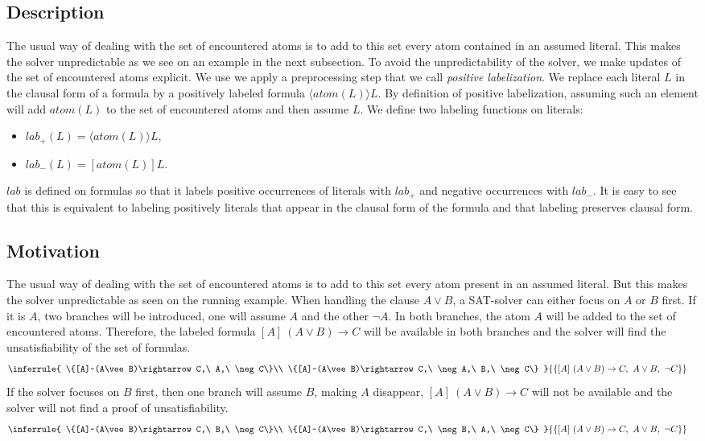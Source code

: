 \documentclass[a4paper,11pt]{article}
\newcommand{\atom}{\mathit{atom}}
\newcommand{\T}{\mathit{lab}}
\begin{document}
\subsection{Description}
The usual way of dealing with the set of encountered atoms is to add to this set every atom
contained in an assumed literal. This makes the solver unpredictable as we see on an example in
the next subsection.
To avoid the unpredictability of the solver, we make updates of the set of encountered atoms explicit.
We use we apply a preprocessing step that we call \emph{positive labelization}.
We replace each literal $L$ in the clausal form of a formula
by a positively labeled formula $\langle\atom(L)\rangle L$. By definition of positive labelization,
assuming such an element will add $\atom(L)$ to the set of encountered atoms and then assume $L$.
We define two labeling functions on literals:
\begin{itemize}
 \item $\T_+(L)=\langle\atom(L)\rangle L$,
 \item $\T_-(L)=[\atom(L)]L$.
\end{itemize}
$\T$ is defined on formulas so that it labels positive occurrences of literals with $\T_+$ and
negative occurrences with $\T_-$. It is easy to see that this is equivalent to labeling
positively literals that appear in the clausal form of the formula and that labeling preserves
clausal form.
\subsection{Motivation}
The usual way of dealing with the set of encountered atoms is to add to this set every atom present
in an assumed literal. But this makes the solver unpredictable as seen on the running
example. When handling the clause $A\vee B$, a SAT-solver can either focus on $A$ or $B$ first. If it is
$A$, two branches will be introduced, one will assume $A$ and the other $\neg A$. In both branches,
the atom $A$ will be added to the set of encountered atoms. Therefore, the labeled formula
$[A]~(A\vee B)\rightarrow C$ will be available in both branches and the solver will find the unsatisfiability
of the set of formulas.
\begin{eqnarray*}
&
\inferrule{
\{[A]~(A\vee B)\rightarrow C,\ A,\ \neg C\}\\
\{[A]~(A\vee B)\rightarrow C,\ \neg A,\ B,\ \neg C\}
}{\{[A]~(A\vee B)\rightarrow C,\ A\vee B,\ \neg C\}}
\end{eqnarray*}
If the solver focuses on $B$ first, then one branch will assume $B$, making
$A$ disappear, $[A]~(A\vee B)\rightarrow C$ will not be available and the solver will not find
a proof of unsatisfiability.
\begin{eqnarray*}
&
\inferrule{
\{[A]~(A\vee B)\rightarrow C,\ B,\ \neg C\}\\
\{[A]~(A\vee B)\rightarrow C,\ \neg B,\ A,\ \neg C\}
}{\{[A]~(A\vee B)\rightarrow C,\ A\vee B,\ \neg C\}}
\end{eqnarray*}
\end{document}
